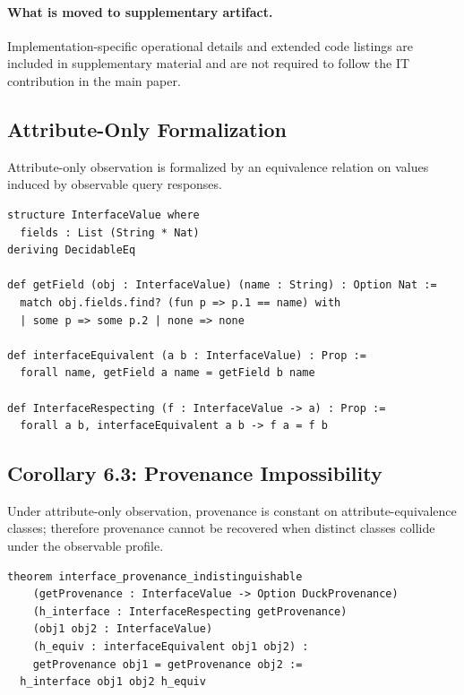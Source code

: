 \paragraph{What is moved to supplementary artifact.}
Implementation-specific operational details and extended code listings are included in supplementary material and are not required to follow the IT contribution in the main paper.

\subsection{Attribute-Only Formalization}\label{interface-only-formalization}

Attribute-only observation is formalized by an equivalence relation on values induced by observable query responses.

\begin{lstlisting}[style=lean]
structure InterfaceValue where
  fields : List (String * Nat)
deriving DecidableEq

def getField (obj : InterfaceValue) (name : String) : Option Nat :=
  match obj.fields.find? (fun p => p.1 == name) with
  | some p => some p.2 | none => none

def interfaceEquivalent (a b : InterfaceValue) : Prop :=
  forall name, getField a name = getField b name

def InterfaceRespecting (f : InterfaceValue -> a) : Prop :=
  forall a b, interfaceEquivalent a b -> f a = f b
\end{lstlisting}

\subsection{Corollary 6.3: Provenance Impossibility}\label{corollary-6.3-interface-only-cannot-provide-provenance}

Under attribute-only observation, provenance is constant on attribute-equivalence classes; therefore provenance cannot be recovered when distinct classes collide under the observable profile.

\begin{lstlisting}[style=lean]
theorem interface_provenance_indistinguishable
    (getProvenance : InterfaceValue -> Option DuckProvenance)
    (h_interface : InterfaceRespecting getProvenance)
    (obj1 obj2 : InterfaceValue)
    (h_equiv : interfaceEquivalent obj1 obj2) :
    getProvenance obj1 = getProvenance obj2 :=
  h_interface obj1 obj2 h_equiv
\end{lstlisting}

